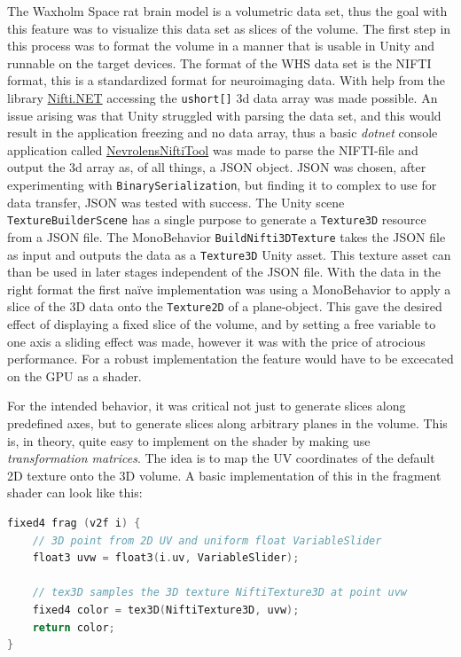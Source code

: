 The Waxholm Space rat brain model is a volumetric data set, thus the goal with this feature was to visualize this data set as slices of the volume. The first step in this process was to format the volume in a manner that is usable in Unity and runnable on the target devices. The format of the WHS data set is the NIFTI format, this is a standardized format for neuroimaging data. With help from the library \href{https://github.com/plwp/Nifti.NET}{Nifti.NET} accessing the \texttt{ushort[]} 3d data array was made possible. An issue arising was that Unity struggled with parsing the data set, and this would result in the application freezing and no data array, thus a basic \textit{dotnet} console application called \href{https://github.com/ovravna/NevrolensNiftiTool}{NevrolensNiftiTool} was made to parse the NIFTI-file and output the 3d array as, of all things, a JSON object. JSON was chosen, after experimenting with \texttt{BinarySerialization}, but finding it to complex to use for data transfer, JSON was tested with success. The Unity scene \texttt{TextureBuilderScene} has a single purpose to generate a \texttt{Texture3D} resource from a JSON file. The MonoBehavior \texttt{BuildNifti3DTexture} takes the JSON file as input and outputs the data as a \texttt{Texture3D} Unity asset. This texture asset can than be used in later stages independent of the JSON file. 
With the data in the right format the first naïve implementation was using a MonoBehavior to apply a slice of the 3D data onto the \texttt{Texture2D} of a plane-object. This gave the desired effect of displaying a fixed slice of the volume, and by setting a free variable to one axis a sliding effect was made, however it was with the price of atrocious performance. For a robust implementation the feature would have to be excecated on the GPU as a shader. 

For the intended behavior, it was critical not just to generate slices along predefined axes, but to generate slices along arbitrary planes in the volume. This is, in theory, quite easy to implement on the shader by making use \textit{transformation matrices}. The idea is to map the UV coordinates of the default 2D texture onto the 3D volume. A basic implementation of this in the fragment shader can look like this:
\begin{lstlisting}[language=c]
fixed4 frag (v2f i) {
    // 3D point from 2D UV and uniform float VariableSlider
    float3 uvw = float3(i.uv, VariableSlider);

    // tex3D samples the 3D texture NiftiTexture3D at point uvw
    fixed4 color = tex3D(NiftiTexture3D, uvw);
    return color;
}
\end{lstlisting}

